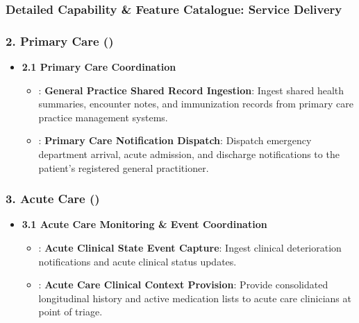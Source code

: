 \par\smallskip
{}\label{rad:enabling:387}
\subsubsection*{Detailed Capability \& Feature Catalogue: Service Delivery}
\label{rad:enabling:389}
\subsubsection*{2. Primary Care (\texttt{})}
\label{rad:enabling:390}

\begin{itemize}

\item 
\textbf{2.1 Primary Care Coordination}


\begin{itemize}

\item 
\texttt{}: \textbf{General Practice Shared Record Ingestion}: Ingest shared health summaries, encounter notes, and immunization records from primary care practice management systems.



\item 
\texttt{}: \textbf{Primary Care Notification Dispatch}: Dispatch emergency department arrival, acute admission, and discharge notifications to the patient's registered general practitioner.



\end{itemize}


\end{itemize}
\label{rad:enabling:394}
\subsubsection*{3. Acute Care (\texttt{})}
\label{rad:enabling:395}

\begin{itemize}

\item 
\textbf{3.1 Acute Care Monitoring \& Event Coordination}


\begin{itemize}

\item 
\texttt{}: \textbf{Acute Clinical State Event Capture}: Ingest clinical deterioration notifications and acute clinical status updates.



\item 
\texttt{}: \textbf{Acute Care Clinical Context Provision}: Provide consolidated longitudinal history and active medication lists to acute care clinicians at point of triage.



\end{itemize}


\end{itemize}
\label{rad:enabling:399}
